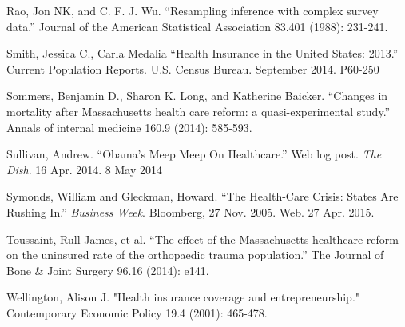 \documentclass[12pt]{article}
\begin{document}
\begin{thebibliography}{99}
Rao, Jon NK, and C. F. J. Wu. ``Resampling inference with complex survey data.'' Journal of the American Statistical Association 83.401 (1988): 231-241.

Smith, Jessica C., Carla Medalia ``Health Insurance in the United States: 2013.'' Current Population Reports. U.S. Census Bureau. September 2014. P60-250

Sommers, Benjamin D., Sharon K. Long, and Katherine Baicker. ``Changes in mortality after Massachusetts health care reform: a quasi-experimental study.'' Annals of internal medicine 160.9 (2014): 585-593.

Sullivan, Andrew. ``Obama's Meep Meep On Healthcare.'' Web log post. \emph{The Dish}. 16 Apr. 2014. 8 May 2014 

Symonds, William and Gleckman, Howard.  ``The Health-Care Crisis: States Are Rushing In.'' \emph{Business Week}. Bloomberg, 27 Nov. 2005. Web. 27 Apr. 2015.

Toussaint, Rull James, et al. ``The effect of the Massachusetts healthcare reform on the uninsured rate of the orthopaedic trauma population.'' The Journal of Bone \& Joint Surgery 96.16 (2014): e141.

Wellington, Alison J. "Health insurance coverage and entrepreneurship." Contemporary Economic Policy 19.4 (2001): 465-478.

\begin{comment}


\bibitem{acharya}
Acharya, Viral, and Krishnamurthy Subramanian, 2009, Bankruptcy codes and innovation, \emph{Review of Financial Studies} 22, 4949-4988.

\bibitem{kaufman}
Atkinson, Robert D., Scott Andes. 2010 ``The 2010 State New Economy Index: Benchmarking Economic Transformation in the States'' The Information Technology and Innovation Foundation, Kauffman Foundation


\bibitem{bhide}
Bhide, Amar. \emph{The origin and evolution of new businesses}. New York: Oxford UP, 2000.

\bibitem{bezos}
Bezos, Jeff. ``2013 Letter to Shareholders.'' Letter to Amazon shareholders. 10 Apr. 2014.

\bibitem{burton}
Burton,M.D., J. B. S{\o}rensen, C.M. Beckman. 2002. ``Coming from good stock: Career histories and new venture formation.'' M. Lounsbury, ed. \emph{Research in the Sociology of Organizations}, Vol. 19. Emerald Publishing, Bingley, UK, 229-262.


\end{comment}
\end{thebibliography}
\end{document}
